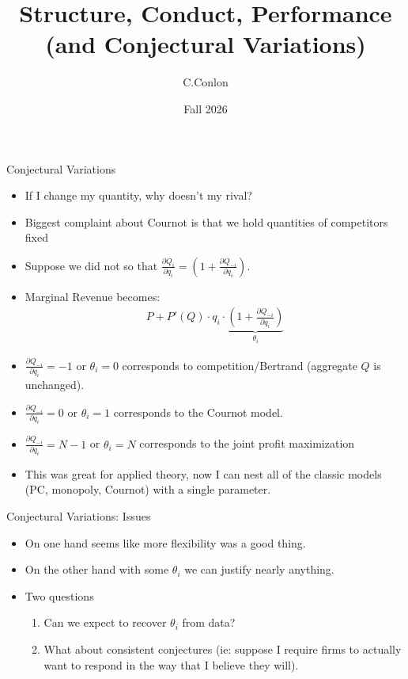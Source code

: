 \documentclass[aspectratio=169,11pt]{beamer}
\title [``SCP'']{Structure, Conduct, Performance (and Conjectural Variations)}
\author{C.Conlon}
\institute{Grad IO }
\date{Fall 2026}
\begin{document}
\begin{frame}
\titlepage
\end{frame}

\begin{frame}{Conjectural Variations}
\small
\begin{itemize}
\item If I change my quantity, why doesn't my rival?
\item Biggest complaint about Cournot is that we hold quantities of competitors fixed
\item Suppose we did not so that $\frac{\partial Q_i}{\partial q_i} = (1 + \frac{\partial Q_{-i}}{\partial q_i}).$
\item Marginal Revenue becomes:
\begin{eqnarray*}
P + P'(Q) \cdot q_i \cdot \underbrace{\left(1+ \frac{\partial Q_{-i}}{\partial q_i} \right)}_{\theta_i}
\end{eqnarray*}
\item $\frac{\partial Q_{-i}}{\partial q_i} =-1$  or $\theta_i =0$ corresponds to competition/Bertrand (aggregate $Q$ is unchanged).
\item $\frac{\partial Q_{-i}}{\partial q_i} =0$ or $\theta_i = 1$ corresponds to the Cournot model.
\item $\frac{\partial Q_{-i}}{\partial q_i} =N-1$ or $\theta_i = N$ corresponds to the joint profit maximization
\item This was great for applied theory, now I can nest all of the classic models (PC, monopoly, Cournot) with a single parameter.
\end{itemize}
\end{frame}

\begin{frame}{Conjectural Variations: Issues}
\begin{itemize}
\item On one hand seems like more flexibility was a good thing.
\item On the other hand with some $\theta_i$ we can justify nearly anything.
\item Two questions
\begin{enumerate}
\item Can we expect to recover $\theta_i$ from data?
\item What about \alert{consistent conjectures} (ie: suppose I require firms to actually want to respond in the way that I believe they will).
\end{enumerate}
\end{itemize}
\end{frame}
\end{document}
